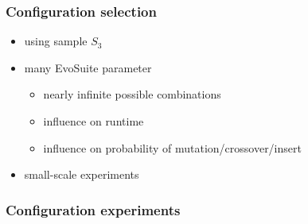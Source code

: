 \begin{frame}
	\frametitle{Configuration selection}
	
	\begin{itemize}
		\item using sample $S_3$
		\item many EvoSuite parameter
		\begin{itemize}
			\item nearly infinite possible combinations
			\item influence on runtime
			\item influence on probability of mutation/crossover/insert 
		\end{itemize}
		\item small-scale experiments
	\end{itemize}
	
\end{frame}

\begin{frame}
	\frametitle{Configuration experiments}
	
	\begin{table}
		\centering
		
	\end{table}
	
\end{frame}